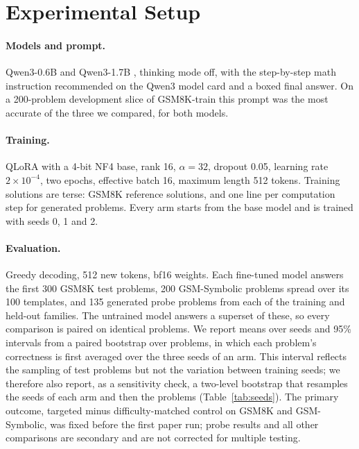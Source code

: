 \documentclass[11pt]{article}
\begin{document}
\section{Experimental Setup}

\paragraph{Models and prompt.} Qwen3-0.6B and Qwen3-1.7B \citep{qwen3}, thinking mode off, with the step-by-step math
instruction recommended on the Qwen3 model card and a boxed final answer. On a 200-problem development slice of
GSM8K-train this prompt was the most accurate of the three we compared, for both models.

\paragraph{Training.} QLoRA \citep{dettmers2023qlora} with a 4-bit NF4 base, rank 16, $\alpha=32$, dropout 0.05,
learning rate $2\times10^{-4}$, two epochs, effective batch 16, maximum length 512 tokens. Training solutions are terse:
GSM8K reference solutions, and one line per computation step for generated problems. Every arm starts from the base
model and is trained with seeds 0, 1 and 2.

\paragraph{Evaluation.} Greedy decoding, 512 new tokens, bf16 weights. Each fine-tuned model answers the first 300 GSM8K
test problems, 200 GSM-Symbolic problems spread over its 100 templates, and 135 generated probe problems from each of
the training and held-out families. The untrained model answers a superset of these, so every comparison is paired on
identical problems. We report means over seeds and 95\% intervals from a paired bootstrap over problems, in which each
problem's correctness is first averaged over the three seeds of an arm. This interval reflects the sampling of test
problems but not the variation between training seeds; we therefore also report, as a sensitivity check, a two-level
bootstrap that resamples the seeds of each arm and then the problems (Table~\ref{tab:seeds}). The primary outcome,
targeted minus difficulty-matched control on GSM8K and GSM-Symbolic, was fixed before the first paper run; probe
results and all other comparisons are secondary and are not corrected for multiple testing.
\end{document}

